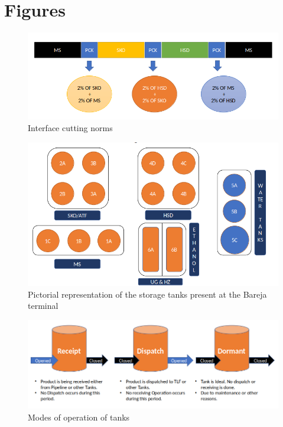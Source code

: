 \documentclass{report}
\begin{document}
	\section{Figures}
	\begin{figure}[h]
		\centering
		\includegraphics[width=\linewidth]{interface_cutting}
		\caption{Interface cutting norms}
		\label{interface_cutting}
	\end{figure}
	\begin{figure}[h]
		\centering
		\includegraphics[width=\linewidth]{bareja_tank_farm}
		\caption{Pictorial representation of the storage tanks present at the Bareja terminal}
		\label{bareja_tank_farm}
	\end{figure}
	\begin{figure}[h]
		\centering
		\includegraphics[width=\linewidth]{tank_modes}
		\caption{Modes of operation of tanks}
		\label{tank_modes}
	\end{figure}
\end{document}
